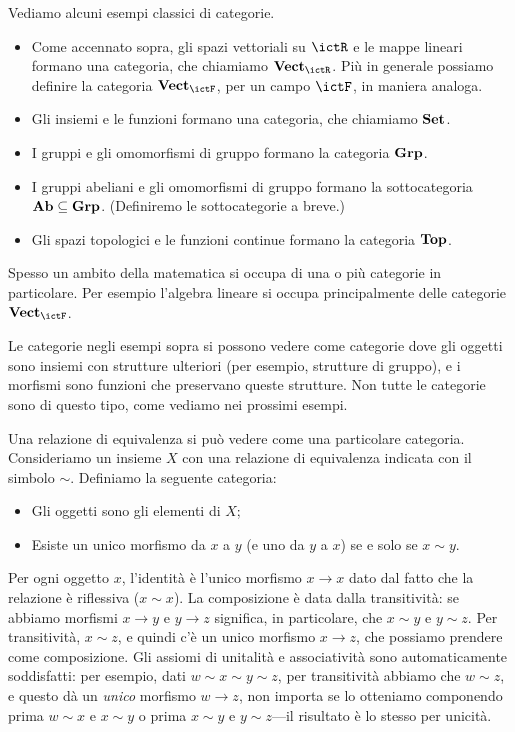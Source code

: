 \begin{examples}
 Vediamo alcuni esempi classici di categorie.
 \begin{itemize}
  \item Come accennato sopra, gli spazi vettoriali su $\ictR$ e le mappe lineari formano una categoria, che chiamiamo $\ctVect_\ictR$. Più in generale possiamo definire la categoria $\ctVect_\ictF$, per un campo $\ictF$, in maniera analoga.
  \item Gli insiemi e le funzioni formano una categoria, che chiamiamo $\mathbf{Set}$.
  \item I gruppi e gli omomorfismi di gruppo formano la categoria $\mathbf{Grp}$.
  \item I gruppi abeliani e gli omomorfismi di gruppo formano la sottocategoria $\mathbf{Ab}\subseteq\mathbf{Grp}$. (Definiremo le sottocategorie a breve.)
  \item Gli spazi topologici e le funzioni continue formano la categoria $\mathbf{Top}$.
 \end{itemize}
Spesso un ambito della matematica si occupa di una o più categorie in particolare. Per esempio l'algebra lineare si occupa principalmente delle categorie $\ctVect_\ictF$.
\end{examples}

Le categorie negli esempi sopra si possono vedere come categorie dove gli oggetti sono insiemi con strutture ulteriori (per esempio, strutture di gruppo), e i morfismi sono funzioni che preservano queste strutture. Non tutte le categorie sono di questo tipo, come vediamo nei prossimi esempi.

\begin{example}
 Una relazione di equivalenza si può vedere come una particolare categoria. Consideriamo un insieme $X$ con una relazione di equivalenza indicata con il simbolo $\sim$.
 Definiamo la seguente categoria:
 \begin{itemize}
  \item Gli oggetti sono gli elementi di $X$;
  \item Esiste un unico morfismo da $x$ a $y$ (e uno da $y$ a $x$) se e solo se $x\sim y$.
 \end{itemize}
 Per ogni oggetto $x$, l'identità è l'unico morfismo $x\to x$ dato dal fatto che la relazione è riflessiva ($x\sim x$).
 La composizione è data dalla transitività: se abbiamo morfismi $x\to y$ e $y\to z$ significa, in particolare, che $x\sim y$ e $y\sim z$. Per transitività, $x\sim z$, e quindi c'è un unico morfismo $x\to z$, che possiamo prendere come composizione.
 Gli assiomi di unitalità e associatività sono automaticamente soddisfatti: per esempio, dati $w\sim x\sim y\sim z$, per transitività abbiamo che $w\sim z$, e questo dà un \emph{unico} morfismo $w\to z$, non importa se lo otteniamo componendo prima $w\sim x$ e $x\sim y$ o prima $x\sim y$ e $y\sim z$---il risultato è lo stesso per unicità.
\end{example}

